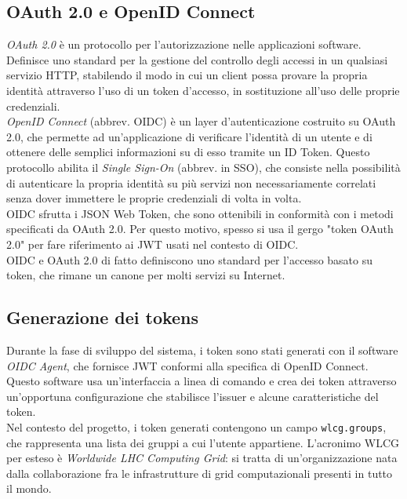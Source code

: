 \subsection{OAuth 2.0 e OpenID Connect}
\textit{OAuth 2.0} è un protocollo per l'autorizzazione nelle applicazioni software. Definisce uno standard per la gestione del controllo degli accessi
in un qualsiasi servizio HTTP, stabilendo il modo in cui un client possa provare la propria identità attraverso l'uso di un token d'accesso, in sostituzione all'uso delle proprie credenziali. 
\\ \textit{OpenID Connect} (abbrev. OIDC) è un layer d'autenticazione costruito su OAuth 2.0, che permette ad un'applicazione di 
verificare l'identità di un utente e di ottenere delle semplici informazioni su di esso tramite un ID Token. Questo protocollo abilita il \textit{Single Sign-On} (abbrev. in SSO), 
che consiste nella possibilità di autenticare la propria identità su più servizi non necessariamente correlati senza dover immettere le proprie credenziali di volta in volta. 
\\OIDC sfrutta i JSON Web Token, che sono ottenibili in conformità con i metodi specificati da OAuth 2.0. Per questo motivo, spesso si usa il gergo
"token OAuth 2.0" per fare riferimento ai JWT usati nel contesto di OIDC.  
\\OIDC e OAuth 2.0 di fatto definiscono uno standard per l'accesso basato su token, che rimane un canone per molti servizi su Internet.

\subsection{Generazione dei tokens}
Durante la fase di sviluppo del sistema, i token sono stati generati con il software \textit{OIDC Agent}, che fornisce JWT conformi alla specifica di OpenID Connect.
Questo software usa un'interfaccia a linea di comando e crea dei token attraverso un'opportuna configurazione che stabilisce l'issuer e alcune caratteristiche del token.
\\ Nel contesto del progetto, i token generati contengono un campo \texttt{wlcg.groups}, che rappresenta una lista dei gruppi a cui l'utente appartiene. 
L'acronimo WLCG per esteso è \textit{Worldwide LHC Computing Grid}: si tratta di un'organizzazione nata dalla collaborazione fra le infrastrutture di 
grid computazionali presenti in tutto il mondo. 


